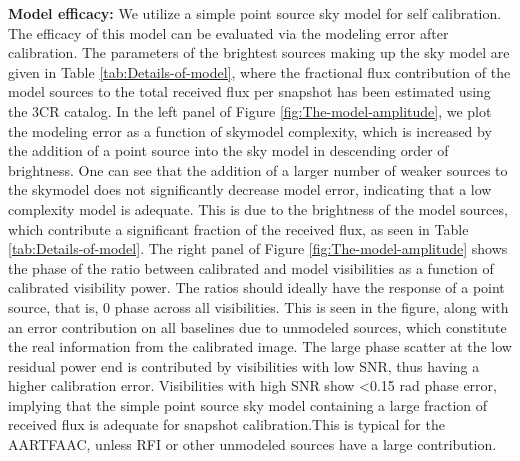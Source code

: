 \documentclass{aa}
\begin{document}
\textbf{Model efficacy:  } We utilize a  simple point source sky  model for self
calibration. The efficacy of this model  can be evaluated via the modeling error
after calibration.   The parameters of the  brightest sources making  up the sky
model are  given in Table \ref{tab:Details-of-model}, where  the fractional flux
contribution of  the model sources to  the total received flux  per snapshot has
been  estimated   using  the  3CR  catalog.    In  the  left   panel  of  Figure
\ref{fig:The-model-amplitude},  we plot  the  modeling error  as  a function  of
skymodel complexity, which  is increased by the addition of  a point source into
the sky model  in descending order of brightness. One can  see that the addition
of a  larger number  of weaker  sources to the  skymodel does  not significantly
decrease model error, indicating that  a low complexity model is adequate.  This
is due  to the brightness of  the model sources, which  contribute a significant
fraction of the received flux, as seen in Table \ref{tab:Details-of-model}.  The
right panel of Figure \ref{fig:The-model-amplitude} shows the phase of the ratio
between calibrated and model visibilities as a function of calibrated visibility
power. The ratios should ideally have the response of a point source, that is, 0
phase across all visibilities.  This is  seen in the figure, along with an error
contribution on  all baselines  due to unmodeled  sources, which  constitute the
real information from  the calibrated image. The large phase  scatter at the low
residual power  end is contributed by  visibilities with low SNR,  thus having a
higher  calibration error.   Visibilities with  high  SNR show  <0.15 rad  phase
error,  implying that  the  simple point  source  sky model  containing a  large
fraction of received  flux is adequate for snapshot  calibration.This is typical
for  the  AARTFAAC,  unless  RFI   or  other  unmodeled  sources  have  a  large
contribution.
\end{document}
